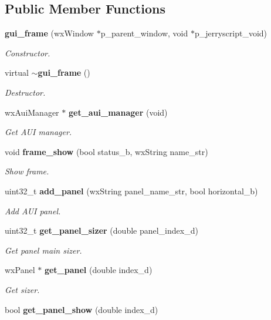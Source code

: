 \subsection*{Public Member Functions}
\begin{DoxyCompactItemize}
\item 
\textbf{ gui\+\_\+frame} (wx\+Window $\ast$p\+\_\+parent\+\_\+window, void $\ast$p\+\_\+jerryscript\+\_\+void)
\begin{DoxyCompactList}\small\item\em Constructor. \end{DoxyCompactList}\item 
virtual \textbf{ $\sim$gui\+\_\+frame} ()
\begin{DoxyCompactList}\small\item\em Destructor. \end{DoxyCompactList}\item 
wx\+Aui\+Manager $\ast$ \textbf{ get\+\_\+aui\+\_\+manager} (void)
\begin{DoxyCompactList}\small\item\em Get A\+UI manager. \end{DoxyCompactList}\item 
void \textbf{ frame\+\_\+show} (bool status\+\_\+b, wx\+String name\+\_\+str)
\begin{DoxyCompactList}\small\item\em Show frame. \end{DoxyCompactList}\item 
uint32\+\_\+t \textbf{ add\+\_\+panel} (wx\+String panel\+\_\+name\+\_\+str, bool horizontal\+\_\+b)
\begin{DoxyCompactList}\small\item\em Add A\+UI panel. \end{DoxyCompactList}\item 
uint32\+\_\+t \textbf{ get\+\_\+panel\+\_\+sizer} (double panel\+\_\+index\+\_\+d)
\begin{DoxyCompactList}\small\item\em Get panel main sizer. \end{DoxyCompactList}\item 
wx\+Panel $\ast$ \textbf{ get\+\_\+panel} (double index\+\_\+d)
\begin{DoxyCompactList}\small\item\em Get sizer. \end{DoxyCompactList}\item 
bool \textbf{ get\+\_\+panel\+\_\+show} (double index\+\_\+d)

\end{DoxyCompactItemize}
